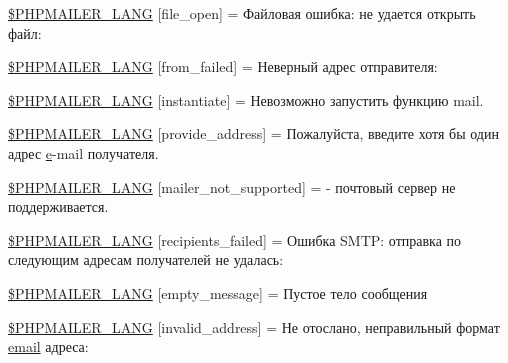 \begin{DoxyCompactItemize}
\item 
\hyperlink{phpmailer_8lang-ru_8php_a28d1a6517bf4c942a0ddd506188ad2e0}{\$\+P\+H\+P\+M\+A\+I\+L\+E\+R\+\_\+\+L\+A\+NG} \mbox{[}\textquotesingle{}file\+\_\+open\textquotesingle{}\mbox{]} = \textquotesingle{}Файловая ошибка\+: не удается открыть файл\+: \textquotesingle{}
\item 
\hyperlink{phpmailer_8lang-ru_8php_adf832ae12155a09be077c6d5e4fd7e22}{\$\+P\+H\+P\+M\+A\+I\+L\+E\+R\+\_\+\+L\+A\+NG} \mbox{[}\textquotesingle{}from\+\_\+failed\textquotesingle{}\mbox{]} = \textquotesingle{}Неверный адрес отправителя\+: \textquotesingle{}
\item 
\hyperlink{phpmailer_8lang-ru_8php_ad58dde16780f4770ccf4dd282ea1f5ad}{\$\+P\+H\+P\+M\+A\+I\+L\+E\+R\+\_\+\+L\+A\+NG} \mbox{[}\textquotesingle{}instantiate\textquotesingle{}\mbox{]} = \textquotesingle{}Невозможно запустить функцию mail.\textquotesingle{}
\item 
\hyperlink{phpmailer_8lang-ru_8php_a8b97897c2406b7392b056f375feeefbb}{\$\+P\+H\+P\+M\+A\+I\+L\+E\+R\+\_\+\+L\+A\+NG} \mbox{[}\textquotesingle{}provide\+\_\+address\textquotesingle{}\mbox{]} = \textquotesingle{}Пожалуйста, введите хотя бы один адрес \hyperlink{jquery-ui_8min_8js_abea95a4e94bc6f4151d5683d4c12c3f4}{e}-\/mail получателя.\textquotesingle{}
\item 
\hyperlink{phpmailer_8lang-ru_8php_aa2ebcb8833ee83a7ad67401c4bb3a6ad}{\$\+P\+H\+P\+M\+A\+I\+L\+E\+R\+\_\+\+L\+A\+NG} \mbox{[}\textquotesingle{}mailer\+\_\+not\+\_\+supported\textquotesingle{}\mbox{]} = \textquotesingle{} -\/ почтовый сервер не поддерживается.\textquotesingle{}
\item 
\hyperlink{phpmailer_8lang-ru_8php_a7589d30bb9b368327c2df015f3e6bcba}{\$\+P\+H\+P\+M\+A\+I\+L\+E\+R\+\_\+\+L\+A\+NG} \mbox{[}\textquotesingle{}recipients\+\_\+failed\textquotesingle{}\mbox{]} = \textquotesingle{}Ошибка S\+M\+T\+P\+: отправка по следующим адресам получателей не удалась\+: \textquotesingle{}
\item 
\hyperlink{phpmailer_8lang-ru_8php_a33772099f637c9d6c2cd7425e0e37fed}{\$\+P\+H\+P\+M\+A\+I\+L\+E\+R\+\_\+\+L\+A\+NG} \mbox{[}\textquotesingle{}empty\+\_\+message\textquotesingle{}\mbox{]} = \textquotesingle{}Пустое тело сообщения\textquotesingle{}
\item 
\hyperlink{phpmailer_8lang-ru_8php_a42d61bcea4c79599ecb44fd062f54d47}{\$\+P\+H\+P\+M\+A\+I\+L\+E\+R\+\_\+\+L\+A\+NG} \mbox{[}\textquotesingle{}invalid\+\_\+address\textquotesingle{}\mbox{]} = \textquotesingle{}Не отослано, неправильный формат \hyperlink{actions_2account_8php_a011c66ae212438e0d7de7c0e40451bb3}{email} адреса\+: \textquotesingle{}

\end{DoxyCompactItemize}
